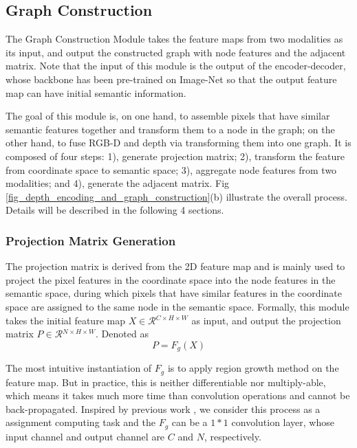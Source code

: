 ﻿\documentclass[journal]{IEEEtran}
\begin{document}
\subsection{Graph Construction}   \label{sec_sub_construct_graph}
   
    The Graph Construction Module takes the feature maps from two modalities as its input, and output the constructed graph with node features and the adjacent matrix. Note that the input of this module is the output of the encoder-decoder, whose backbone has been pre-trained on Image-Net so that the output feature map can have initial semantic information. 
  
    The goal of this module is, on one hand, to assemble pixels that have similar semantic features together and transform them to a node in the graph; on the other hand, to fuse RGB-D and depth via transforming them into one graph. It is composed of four steps: 1), generate projection matrix; 2), transform the feature from coordinate space to semantic space; 3), aggregate node features from two modalities; and 4), generate the adjacent matrix. Fig \ref{fig_depth_encoding_and_graph_construction}(b) illustrate the overall process. Details will be described in the following 4 sections. 


\subsubsection{Projection Matrix Generation}\label{sec_generate_proj_matrix}
   
    The projection matrix is derived from the 2D feature map and is mainly used to project the pixel features in the coordinate space into the node features in the semantic space, during which pixels that have similar features in the coordinate space are assigned to the same node in the semantic space. Formally, this module takes the initial feature map ${X}\in\mathcal{R}{^{C\times H\times W}}$ as input, and output the projection matrix ${P}\in\mathcal{R}{^{N\times H \times W}}$. Denoted as 
    \begin{equation}\label{eq_gen_proj}
    P = F_g(X)
    \end{equation}

   
    The most intuitive instantiation of $F_g$ is to apply region growth method on the feature map. But in practice, this is neither differentiable nor multiply-able, which means it takes much more time than convolution operations and cannot be back-propagated. Inspired by previous work \cite{chen2019glore}, we consider this process as a assignment computing task and the $F_g$ can be a $1*1$ convolution layer, whose input channel and output channel are $C$ and $N$, respectively. 
\end{document}
